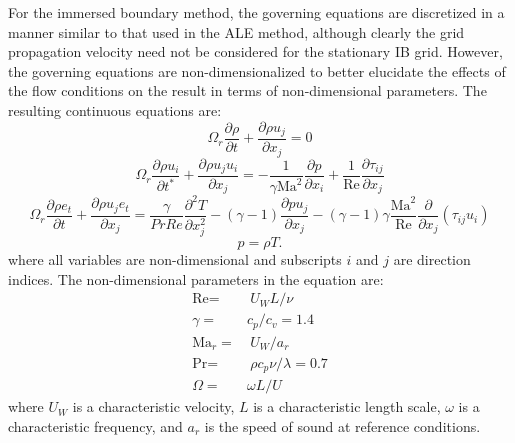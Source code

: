 \documentclass{article}
\newcommand{\pder}[2][]{\frac{\partial#1}{\partial#2}}
\newcommand{\sder}[2][]{\frac{\partial^{2}#1}{\partial#2^{2}}}
\begin{document}
For the immersed boundary method, the governing equations are discretized in a manner similar to that used in the ALE method, although clearly the grid propagation velocity need not be considered for the stationary IB grid. However, the governing equations are non-dimensionalized to better elucidate the effects of the flow conditions on the result in terms of non-dimensional parameters. The resulting continuous equations are:
%
\begin{equation}
\label{continuity-non}
\Omega_r \pder[\rho]{t} +  \pder[\rho u_j]{x_j} = 0
\end{equation}
%
\begin{equation}
\label{momentum-non}
\Omega_r \pder[\rho u_i]{t^*} + \pder[\rho u_j u_i]{x_j} = -\frac{1}{\gamma \textrm{Ma}^2}\pder[p]{x_i} + \frac{1}{\textrm{Re}} \pder[\tau_{ij}]{x_j}
\end{equation}
%
\begin{equation}
\label{temp-non}
\Omega_r \pder[\rho e_t]{t} + \pder[\rho u_j e_t]{x_j} = 
\frac{\gamma}{PrRe}\sder[T]{x_j} - (\gamma -1) \pder[p u_j]{x_j}
- (\gamma -1)\gamma \frac{\textrm{Ma}^2}{\textrm{Re}} \pder{x_j} \left( \tau_{ij}u_i  \right)
\end{equation}
%
\begin{equation}
\label{idg-non}
p = \rho T.
\end{equation}
%
where all variables are non-dimensional and subscripts $i$ and $j$ are direction indices. The non-dimensional parameters in the equation are:
\begin{equation}
\begin{aligned}
\textrm{Re} =& \ U_W L / \nu \\
\gamma =& c_p/c_v = 1.4\\
\textrm{Ma}_r =&\ U_W/a_r \\
\textrm{Pr} =&\ \rho c_p \nu / \lambda = 0.7 \\
\Omega =& \omega L / U
\end{aligned}
\end{equation}
where $U_W$ is a characteristic velocity, $L$ is a characteristic length scale, $\omega$ is a characteristic frequency, and $a_r$ is the speed of sound at reference conditions. \\
\end{document}
